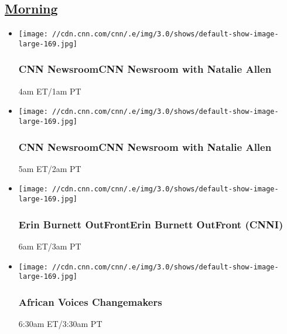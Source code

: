 \hypertarget{morning-}{%
\subsection{\texorpdfstring{\href{/tv/schedule/cnn/index.html}{Morning}~}{Morning~}}\label{morning-}}

\begin{itemize}
\item
  \texttt{[image: //cdn.cnn.com/cnn/.e/img/3.0/shows/default-show-image-large-169.jpg]}

  \hypertarget{cnn-newsroomcnn-newsroom-with-natalie-allen-}{%
  \subsubsection{CNN NewsroomCNN Newsroom with Natalie Allen
  }\label{cnn-newsroomcnn-newsroom-with-natalie-allen-}}

  4am ET/1am PT
\end{itemize}

\begin{itemize}
\item
  \texttt{[image: //cdn.cnn.com/cnn/.e/img/3.0/shows/default-show-image-large-169.jpg]}

  \hypertarget{cnn-newsroomcnn-newsroom-with-natalie-allen--1}{%
  \subsubsection{CNN NewsroomCNN Newsroom with Natalie Allen
  }\label{cnn-newsroomcnn-newsroom-with-natalie-allen--1}}

  5am ET/2am PT
\end{itemize}

\begin{itemize}
\item
  \texttt{[image: //cdn.cnn.com/cnn/.e/img/3.0/shows/default-show-image-large-169.jpg]}

  \hypertarget{erin-burnett-outfronterin-burnett-outfront-cnni-}{%
  \subsubsection{Erin Burnett OutFrontErin Burnett OutFront (CNNI)
  }\label{erin-burnett-outfronterin-burnett-outfront-cnni-}}

  6am ET/3am PT
\end{itemize}

\begin{itemize}
\item
  \texttt{[image: //cdn.cnn.com/cnn/.e/img/3.0/shows/default-show-image-large-169.jpg]}

  \hypertarget{african-voices-changemakers}{%
  \subsubsection{African Voices
  Changemakers}\label{african-voices-changemakers}}

  6:30am ET/3:30am PT
\end{itemize}

